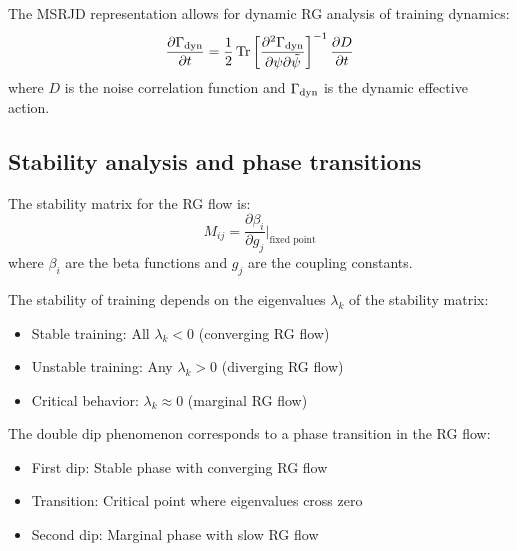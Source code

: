 \begin{proposition}
\label{prop:dynamic_rg_training}
The MSRJD representation allows for dynamic RG analysis of training dynamics:
\begin{equation}
  \frac{\partial \Gamma_{\rm dyn}}{\partial t} = \frac{1}{2} \Tr \left[ \frac{\partial^2 \Gamma_{\rm dyn}}{\partial \psi \partial \tilde{\psi}} \right]^{-1} \frac{\partial D}{\partial t}
  \label{eq:dynamic_rg}
\end{equation}
where $D$ is the noise correlation function and $\Gamma_{\rm dyn}$ is the dynamic effective action.
\end{proposition}

\subsection{Stability analysis and phase transitions}

\begin{definition}
\label{def:stability_matrix_training}
The stability matrix for the RG flow is:
\begin{equation}
  M_{ij} = \frac{\partial \beta_i}{\partial g_j} \bigg|_{\text{fixed point}}
  \label{eq:stability_matrix}
\end{equation}
where $\beta_i$ are the beta functions and $g_j$ are the coupling constants.
\end{definition}

\begin{theorem}
\label{thm:stability_classification_training}
The stability of training depends on the eigenvalues $\lambda_k$ of the stability matrix:
\begin{itemize}
\item Stable training: All $\lambda_k < 0$ (converging RG flow)
\item Unstable training: Any $\lambda_k > 0$ (diverging RG flow)
\item Critical behavior: $\lambda_k \approx 0$ (marginal RG flow)
\end{itemize}
\end{theorem}

\begin{proposition}
\label{prop:double_dip_phase_transition}
The double dip phenomenon corresponds to a phase transition in the RG flow:
\begin{itemize}
\item First dip: Stable phase with converging RG flow
\item Transition: Critical point where eigenvalues cross zero
\item Second dip: Marginal phase with slow RG flow
\end{itemize}
\end{proposition}


